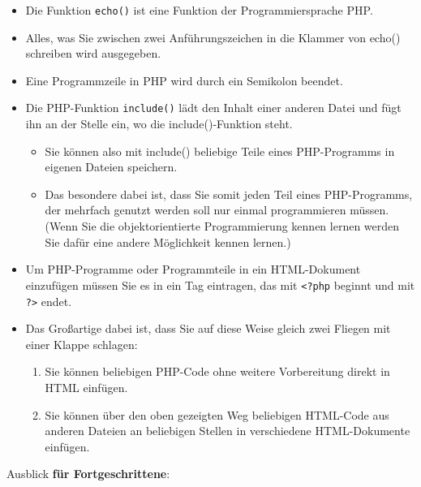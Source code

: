 \begin{itemize}
	\item Die Funktion \verb|echo()| ist eine Funktion der Programmiersprache PHP.
	\item Alles, was Sie zwischen zwei Anführungszeichen in die Klammer von echo() schreiben wird ausgegeben.
	\item Eine Programmzeile in PHP wird durch ein Semikolon beendet.
	\item Die PHP-Funktion \verb|include()| lädt den Inhalt einer anderen Datei und fügt ihn an der Stelle ein, wo die include()-Funktion steht.
	\begin{itemize}
		\item Sie können also mit include() beliebige Teile eines PHP-Programms in eigenen Dateien speichern.
		\item Das besondere dabei ist, dass Sie somit jeden Teil eines PHP-Programms, der mehrfach genutzt werden soll nur einmal programmieren müssen. (Wenn Sie die objektorientierte Programmierung kennen lernen werden Sie dafür eine andere Möglichkeit kennen lernen.)
	\end{itemize}
	\item Um PHP-Programme oder Programmteile in ein HTML-Dokument einzufügen müssen Sie es in ein Tag eintragen, das mit \verb|<?php| beginnt und mit \verb|?>| endet.
	\item Das Großartige dabei ist, dass Sie auf diese Weise gleich zwei Fliegen mit einer Klappe schlagen:
	\begin{enumerate}
		\item Sie können beliebigen PHP-Code ohne weitere Vorbereitung direkt in HTML einfügen.
		\item Sie können über den oben gezeigten Weg beliebigen HTML-Code aus anderen Dateien an beliebigen Stellen in verschiedene HTML-Dokumente einfügen.
	\end{enumerate}
\end{itemize}

Ausblick \textbf{für Fortgeschrittene}: 

